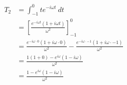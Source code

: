 \documentclass[preview]{standalone}
\begin{document}
\begin{align*}
T_{2}&= \int_{-1}^{0}t e^{-i\omega t} \ dt \\ &=\left[\frac{e^{-i\omega t}(1+i\omega t)}{\omega^{2}}\right]_{-1}^{0} \\ &=\frac{e^{-i\omega\cdot 0}(1+i\omega\cdot 0)}{\omega^{2}}-\frac{e^{-i\omega\cdot -1}(1+i\omega\cdot -1)}{\omega^{2}} \\ &=\frac{1(1+0)-e^{i\omega}(1-i\omega)}{\omega^{2}} \\ &= \frac{1-e^{i\omega}(1-i\omega)}{\omega^{2}}
\end{align*}
\end{document}
